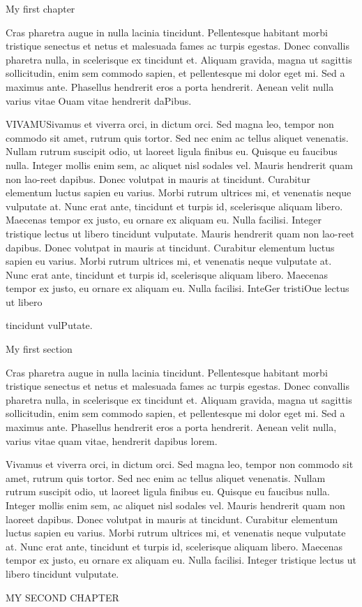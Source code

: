 


\chap My first chapter

Cras pharetra {\caps\currvar augue in nulla} lacinia tincidunt. Pellentesque habitant morbi tristique senectus et netus et malesuada fames ac turpis egestas. Donec convallis pharetra nulla, in scelerisque ex tincidunt et. Aliquam gravida, magna ut sagittis sollicitudin, enim sem commodo sapien, et pellentesque mi dolor eget mi. Sed a maximus ante. Phasellus hendrerit eros a porta hendrerit. Aenean velit nulla varius vitae Ouam vitae hendrerit daPibus.

VIVAMUSivamus et viverra orci, in dictum orci. Sed magna leo, tempor non commodo sit amet, rutrum quis tortor. Sed nec enim ac tellus aliquet venenatis. Nullam rutrum suscipit odio, ut laoreet ligula finibus eu. Quisque eu faucibus nulla. Integer mollis enim sem, ac aliquet nisl sodales vel. Mauris hendrerit quam non lao-reet dapibus. Donec volutpat in mauris at tincidunt. Curabitur elementum luctus sapien eu varius. Morbi rutrum ultrices mi, et venenatis neque vulputate at. Nunc erat ante, tincidunt et turpis id, scelerisque aliquam libero. Maecenas tempor ex justo, eu ornare ex aliquam eu. Nulla facilisi. Integer tristique lectus ut libero tincidunt vulputate. Mauris hendrerit quam non lao-reet dapibus. Donec volutpat in mauris at tincidunt. Curabitur elementum luctus sapien eu varius. Morbi rutrum ultrices mi, et venenatis neque vulputate at. Nunc erat ante, tincidunt et turpis id, scelerisque aliquam libero. Maecenas tempor ex justo, eu ornare ex aliquam eu. Nulla facilisi. InteGer tristiOue lectus ut libero\strut  tincidunt vulPutate.

\sec My first section

Cras pharetra augue in nulla lacinia tincidunt. Pellentesque habitant morbi tristique senectus et netus et malesuada fames ac turpis egestas. Donec convallis pharetra nulla, in scelerisque ex tincidunt et. Aliquam gravida, magna ut sagittis sollicitudin, enim sem commodo sapien, et pellentesque mi dolor eget mi. Sed a maximus ante. Phasellus hendrerit eros a porta hendrerit. Aenean velit nulla, varius vitae quam vitae, hendrerit dapibus lorem.

Vivamus et viverra orci, in dictum orci. Sed magna leo, tempor non commodo sit amet, rutrum quis tortor. Sed nec enim ac tellus aliquet venenatis. Nullam rutrum suscipit odio, ut laoreet ligula finibus eu. Quisque eu faucibus nulla. Integer mollis enim sem, ac aliquet nisl sodales vel. Mauris hendrerit quam non laoreet dapibus. Donec volutpat in mauris at tincidunt. Curabitur elementum luctus sapien eu varius. Morbi rutrum ultrices mi, et venenatis neque vulputate at. Nunc erat ante, tincidunt et turpis id, scelerisque aliquam libero. Maecenas tempor ex justo, eu ornare ex aliquam eu. Nulla facilisi. Integer tristique lectus ut libero tincidunt vulputate.

\chap MY SECOND CHAPTER

%

\bye
